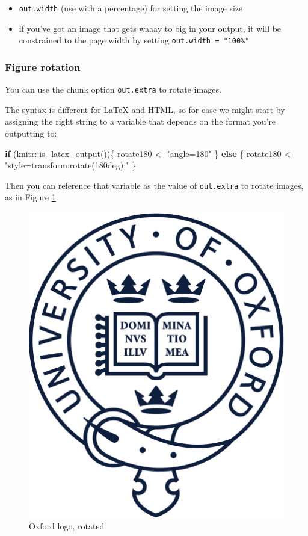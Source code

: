 \documentclass[a4paper, twoside]{templates/ociamthesis}
\providecommand{\tightlist}{%
  \setlength{\itemsep}{0pt}\setlength{\parskip}{0pt}}
\newenvironment{Shaded}{\begin{snugshade}}{\end{snugshade}}
\newcommand{\ControlFlowTok}[1]{\textcolor[rgb]{0.13,0.29,0.53}{\textbf{#1}}}
\newcommand{\FunctionTok}[1]{\textcolor[rgb]{0.00,0.00,0.00}{#1}}
\newcommand{\NormalTok}[1]{#1}
\newcommand{\OtherTok}[1]{\textcolor[rgb]{0.56,0.35,0.01}{#1}}
\newcommand{\SpecialCharTok}[1]{\textcolor[rgb]{0.00,0.00,0.00}{#1}}
\newcommand{\StringTok}[1]{\textcolor[rgb]{0.31,0.60,0.02}{#1}}
\renewenvironment{Shaded}
{
  \vspace{10pt}%
  \begin{snugshade}%
}{%
  \end{snugshade}%
  \vspace{8pt}%
}
\begin{document}
\begin{itemize}
\tightlist
\item
  \texttt{out.width} (use with a percentage) for setting the image size
\item
  if you've got an image that gets waaay to big in your output, it will be constrained to the page width by setting \texttt{out.width\ =\ "100\%"}
\end{itemize}

\hypertarget{figure-rotation}{%
\subsubsection*{Figure rotation}\label{figure-rotation}}

You can use the chunk option \texttt{out.extra} to rotate images.

The syntax is different for LaTeX and HTML, so for ease we might start by assigning the right string to a variable that depends on the format you're outputting to:

\begin{Shaded}
\begin{Highlighting}[]
\ControlFlowTok{if}\NormalTok{ (knitr}\SpecialCharTok{::}\FunctionTok{is\_latex\_output}\NormalTok{())\{}
\NormalTok{  rotate180 }\OtherTok{\textless{}{-}} \StringTok{"angle=180"}
\NormalTok{\} }\ControlFlowTok{else}\NormalTok{ \{}
\NormalTok{  rotate180 }\OtherTok{\textless{}{-}} \StringTok{"style=\textquotesingle{}transform:rotate(180deg);\textquotesingle{}"}
\NormalTok{\}}
\end{Highlighting}
\end{Shaded}

Then you can reference that variable as the value of \texttt{out.extra} to rotate images, as in Figure \ref{fig:oxford-logo-rotated}.

\begin{figure}

{\centering \includegraphics[width=0.5\linewidth,angle=180]{figures/sample-content/beltcrest} 

}

\caption{Oxford logo, rotated}\label{fig:oxford-logo-rotated}
\end{figure}
\end{document}
